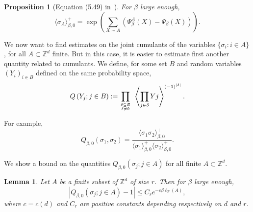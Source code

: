 \documentclass{amsart}
\newcommand{\field}[1]{\mathbb{#1}}
\newcommand{\Z}{\field{Z}}
\numberwithin{equation}{section}
\newtheorem{lemma}[theorem]{Lemma}
\newtheorem{proposition}[theorem]{Proposition}
\theoremstyle{remark}
\begin{document}
\begin{proposition}[Equation (5.49) in~\cite{Velenik}]
\label{prop:expectation}
For $\beta$ large enough,
$$\langle \sigma_A\rangle^+_{\beta,0} = \exp \left( \sum_{X \sim A } (\Psi^A_{\beta}(X) -  \Psi_{\beta}(X)) \right).$$
\end{proposition}



We now want to find estimates on the joint cumulants of the variables $\{\sigma_i : i \in A\}$, for all $A \subset \Z^d$ finite.
But in this case, it is easier to estimate first another quantity related to cumulants. We define, for some set $B$ and random variables $(Y_i)_{i \in B}$ defined on the same probability space,
$$Q \left(Y_j; j \in B \right) := \prod_{ \delta \subseteq B \atop \delta \neq \emptyset}  \ \left\langle \prod_{j \in \delta} Yj \right\rangle^{(-1)^{|\delta|}} .$$

For example,
$$Q_{\beta,0}(\sigma_1, \sigma_2) = \frac{\langle \sigma_1 \sigma_2 \rangle_{\beta,0}^+ }{\langle\sigma_1\rangle_{\beta,0}^+ \langle\sigma_2\rangle_{\beta,0}^+}.$$

We show a bound on the quantities $Q_{\beta,0} \left(\sigma_j; j \in A \right)$ for all finite $A \subset \Z^d.$ 

\begin{lemma}
\label{lem:quotient}
Let $A$ be a finite subset of $\Z^d$ of size $r$. Then for $\beta$ large enough,
$$ \left| Q_{\beta,0} \left(\sigma_j; j \in A \right)  - 1 \right| \leq C_r e^{-c \beta \ell_T(A)},$$
where $c=c(d)$ and $C_r$ are positive constants depending respectively on $d$ and $r$.
\end{lemma}
\end{document}
